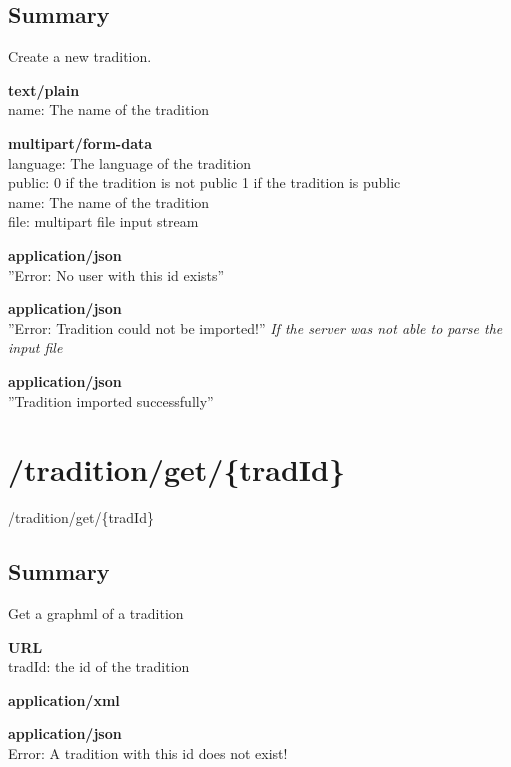 \documentclass[11pt,fleqn,openany]{book} %
\begin{document}
\subsection*{Summary}
Create a new tradition.
\begin{parameter}
\textbf{text/plain}\\
name: The name of the tradition
\end{parameter}
\begin{parameter}
\textbf{multipart/form-data}\\
language: The language of the tradition\\
public: 0 if the tradition is not public 1 if the tradition is public\\
name: The name of the tradition\\
file: multipart file input stream
\end{parameter}
\begin{return}[CONFLICT]
\textbf{application/json}\\
''Error: No user with this id exists''
\end{return}
\begin{return}
\textbf{application/json}\\
''Error: Tradition could not be imported!''
\textit{If the server was not able to parse the input file}
\end{return}
\begin{return}[OK]
\textbf{application/json}\\
''Tradition imported successfully''
\end{return}

\section{/tradition/get/\{tradId\}}
\begin{get}
/tradition/get/\{tradId\}
\end{get}

\subsection*{Summary}
Get a graphml of a tradition
\begin{parameter}\textbf{URL}\\
tradId: the id of the tradition \\
\end{parameter}
\begin{return}[OK]
\textbf{application/xml}\\

\end{return}
\begin{return}
\textbf{application/json}\\
Error: A tradition with this id does not exist!
\end{return}
\end{document}
